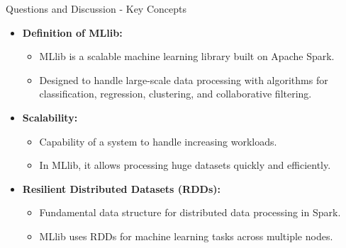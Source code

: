 \documentclass[aspectratio=169]{beamer}
\begin{document}
\begin{frame}[fragile]{Questions and Discussion - Key Concepts}
    \begin{itemize}
        \item \textbf{Definition of MLlib:} 
            \begin{itemize}
                \item MLlib is a scalable machine learning library built on Apache Spark.
                \item Designed to handle large-scale data processing with algorithms for classification, regression, clustering, and collaborative filtering.
            \end{itemize}
        \item \textbf{Scalability:} 
            \begin{itemize}
                \item Capability of a system to handle increasing workloads.
                \item In MLlib, it allows processing huge datasets quickly and efficiently.
            \end{itemize}
        \item \textbf{Resilient Distributed Datasets (RDDs):}
            \begin{itemize}
                \item Fundamental data structure for distributed data processing in Spark.
                \item MLlib uses RDDs for machine learning tasks across multiple nodes.
            \end{itemize}
    \end{itemize}
\end{frame}
\end{document}
